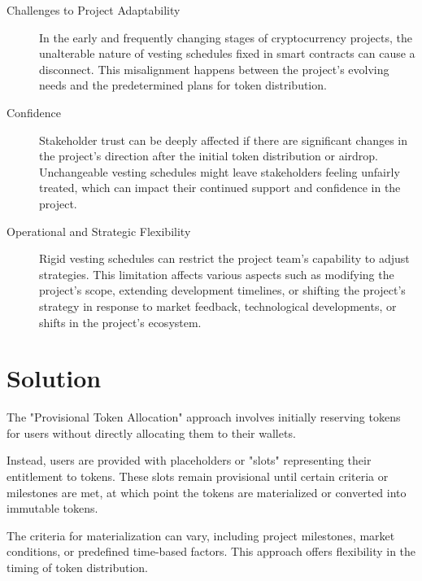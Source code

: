 \documentclass[12pt,oneside]{article}
\begin{document}
\begin{description}
  \item[Challenges to Project Adaptability]
  In the early and frequently changing stages of cryptocurrency projects, the unalterable nature 
  of vesting schedules fixed in smart contracts can cause a disconnect. This misalignment happens 
  between the project's evolving needs and the predetermined plans for token distribution.

  \item[Confidence]
  Stakeholder trust can be deeply affected if there are significant changes in the project's direction
  after the initial token distribution or airdrop. Unchangeable vesting schedules might leave stakeholders 
  feeling unfairly treated, which can impact their continued support and confidence in the project.

  \item[Operational and Strategic Flexibility]
  Rigid vesting schedules can restrict the project team's capability to adjust strategies. 
  This limitation affects various aspects such as modifying the project's scope, extending development 
  timelines, or shifting the project's strategy in response to market feedback, technological developments, 
  or shifts in the project's ecosystem.
\end{description}


\section{Solution}

The "Provisional Token Allocation" approach involves initially reserving tokens for users without 
directly allocating them to their wallets. 

Instead, users are provided with placeholders or "slots" representing their entitlement to tokens. 
These slots remain provisional until certain criteria or milestones are met, at which point 
the tokens are materialized or converted into immutable tokens. 

The criteria for materialization 
can vary, including project milestones, market conditions, or predefined time-based factors. 
This approach offers flexibility in the timing of token distribution.
\end{document}
